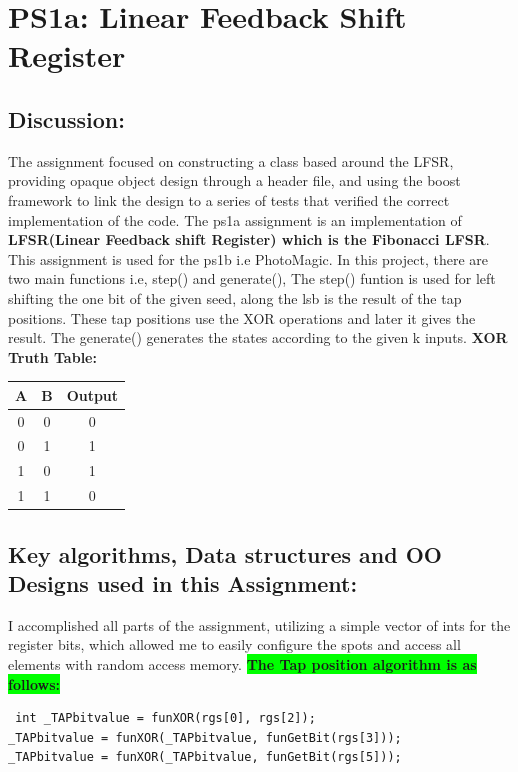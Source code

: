 \section{PS1a: Linear Feedback Shift Register}\label{sec:ps1a}
\graphicspath{{ps1a}}
\subsection{Discussion:}\label{sec:ps1a:disc}
       The assignment focused on constructing a class based around the LFSR, providing opaque object design through a header file, and using the boost framework to link the design to a series of tests that verified the correct implementation of the code. The ps1a assignment is an implementation of \textbf{LFSR(Linear Feedback shift Register) which is the Fibonacci LFSR}. This assignment is used for the ps1b i.e PhotoMagic. In this project, there are two main functions i.e, step() and generate(), The step() funtion is used for left shifting the one bit of the given seed, along the lsb is the result of the tap positions. These tap positions use the XOR operations and later it gives the result.
    The generate() generates the states according to the given k inputs.\newline
    \textbf{XOR Truth Table:}
    \begin{center}
 \begin{tabular}{||c c c ||} 
 \hline
 A & B & Output \\ [0.5ex] 
 \hline\hline
 0 & 0 & 0 \\ 
 \hline
 0 & 1 & 1 \\
 \hline
 1 & 0 & 1 \\
 \hline
 1 & 1 & 0 \\ [1ex] 
 \hline
\end{tabular}
\end{center}


\subsection{Key algorithms, Data structures and OO Designs used in this Assignment:}\label{sec:ps1a:kdo}
        I accomplished all parts of the assignment, utilizing a simple vector of ints for the register bits, which allowed me to easily configure the spots and access all elements with random access memory. 
        \textbf{\colorbox{lime}{\textbf{The Tap position algorithm is as follows:}}}
 \begin{lstlisting}
 int _TAPbitvalue = funXOR(rgs[0], rgs[2]);
_TAPbitvalue = funXOR(_TAPbitvalue, funGetBit(rgs[3]));
_TAPbitvalue = funXOR(_TAPbitvalue, funGetBit(rgs[5]));
 \end{lstlisting}

